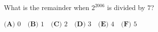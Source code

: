 What is the remainder when $2^{2006}$ is divided by $7$?

$\textbf{(A) }0\quad\textbf{(B) }1\quad\textbf{(C) }2\quad\textbf{(D) }3\quad\textbf{(E) }4\quad\textbf{(F) }5$
